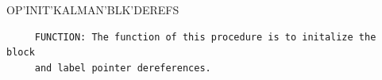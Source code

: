 \begin{frame}
OP'INIT'KALMAN'BLK'DEREFS
\begin{verbatim}
     FUNCTION: The function of this procedure is to initalize the block
     and label pointer dereferences.


\end{verbatim}
\end{frame}
